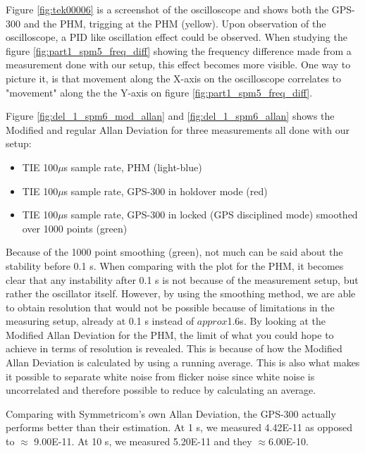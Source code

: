 \documentclass[11pt,english,a4paper]{article}
\begin{document}
Figure \ref{fig:tek00006} is a screenshot of the oscilloscope and shows both the GPS-300 and the PHM, trigging at the PHM (yellow). Upon observation of the oscilloscope, a PID like oscillation effect could be observed. When studying the figure \ref{fig:part1_spm5_freq_diff} showing the frequency difference made from a measurement done with our setup, this effect becomes more visible. One way to picture it, is that movement along the X-axis on the oscilloscope correlates to "movement" along the the Y-axis on figure \ref{fig:part1_spm5_freq_diff}. 


\newpage
Figure \ref{fig:del_1_spm6_mod_allan} and \ref{fig:del_1_spm6_allan} shows the Modified and regular Allan Deviation for three measurements all done with our setup:
\begin{itemize}
  \item TIE 100$\mu$s sample rate, PHM (light-blue)
  \item TIE 100$\mu$s sample rate, GPS-300 in holdover mode (red)
  \item TIE 100$\mu$s sample rate, GPS-300 in locked (GPS disciplined mode) smoothed over 1000 points (green)
\end{itemize}
Because of the 1000 point smoothing (green), not much can be said about the stability before 0.1 s. When comparing with the plot for the PHM, it becomes clear that any instability after 0.1 s is not because of the measurement setup, but rather the oscillator itself. However, by using the smoothing method, we are able to obtain resolution that would not be possible because of limitations in the measuring setup, already at 0.1 s instead of $approx$1.6s. By looking at the Modified Allan Deviation for the PHM, the limit of what you could hope to achieve in terms of resolution is revealed. This is because of how the Modified Allan Deviation is calculated by using a running average. This is also what makes it possible to separate white noise from flicker noise since white noise is uncorrelated and therefore possible to reduce by calculating an average.   

Comparing with Symmetricom's own Allan Deviation, the GPS-300 actually performs better than their estimation. At 1 s, we measured 4.42E-11 as opposed to $\approx$ 9.00E-11. At 10 s, we measured 5.20E-11 and they $\approx$6.00E-10.
\end{document}
